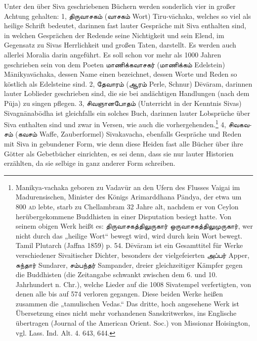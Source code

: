 \documentclass{article}
\newcommand{\TamilText}[1]{\texttamil{#1}}
\newcommand{\tam}[1]{\TamilText{#1}}
\begin{document}
Unter den über Siva geschriebenen Büchern werden sonderlich vier in großer Achtung gehalten: 1, \tam{திருவாசகம்} (\tam{வாசகம்} Wort) Tiru-v\={a}chaka, welches so viel als heilige Schrift bedeutet, darinnen fast lauter Gespräche mit Siva enthalten sind, in welchen Gesprächen der Redende seine Nichtigkeit und sein Elend, im Gegensatz zu Sivas Herrlichkeit und großen Taten, darstellt. Es werden auch allerlei Moralia darin angeführt. Es soll schon vor mehr als 1000 Jahren geschrieben sein von dem Poeten \tam{மாணிக்கவாசகர்} (\tam{மாணிக்கம்} Edelstein) M\={a}nikyav\={a}chaka, dessen Name einen bezeichnet, dessen Worte und Reden so köstlich als Edelsteine sind. 2, \tam{தேவாரம்} (\tam{ஆரம்} Perle, Schnur) D\={e}v\={a}ram, darinnen lauter Loblieder geschrieben sind, die sie bei andächtigen Handlungen (nach dem P\={u}ja) zu singen pflegen. 3, \tam{சிவஞானபோதம்} (Unterricht in der Kenntnis Sivas) Sivagn\={a}nab\={o}dha ist gleichfalls ein solches Buch, darinnen lauter Lobsprüche über Siva enthalten sind und zwar in Versen, wie auch die vorhergehenden.\footnote{Manikya-vachaka geboren zu Vadav\={u}r an den Ufern des Flusses Vaigai im Madurensischen, Minister des Königs Arimarddhana P\={a}ndya, der etwa um 800 \textsc{ad} lebte, starb zu Chellambram 32 Jahre alt, nachdem er von Ceylon herübergekommene Buddhisten in einer Disputation besiegt hatte. Von seinem obigen Werk heißt es: \tam{திருவாசகத்திலுருகார்} \tam{ஒருவாசகத்திலுமுருகார்}, wer nicht durch das „heilige Wort“ bewegt wird, wird durch kein Wort bewegt. Tamil Plutarch (Jaffna 1859) p. 54. D\={e}v\={a}ram ist ein Gesamttitel für Werke verschiedener Sivaitischer Dichter, besonders der vielgefeierten \tam{அப்பர்} Apper, \tam{சுந்தார்} Sundarer, \tam{சம்பந்தர்} Sampander, dreier gleichzeitiger Kämpfer gegen die Buddhisten (die Zeitangabe schwankt zwischen dem 6. und 10. Jahrhundert n. Chr.), welche Lieder auf die 1008 Sivatempel verfertigten, von denen alle bis auf 574 verloren gegangen. Diese beiden Werke heißen zusammen die „tamulischen Vedas.“ Das dritte, hoch angesehene Werk ist Übersetzung eines nicht mehr vorhandenen Sanskritwerkes, ins Englische übertragen (Journal of the American Orient. Soc.) von Missionar Hoisington, vgl. Lass. Ind. Alt. 4. 643, 644.} 4, \tam{சிவகவசம்} (\tam{கவசம்} Waffe, Zauberformel) Sivakavacha, ebenfalls Gespräche und Reden mit Siva in gebundener Form, wie denn diese Heiden fast alle Bücher über ihre Götter als Gebetbücher einrichten, es sei denn, dass sie nur lauter Historien erzählten, da sie selbige in ganz anderer Form schreiben.
\end{document}
